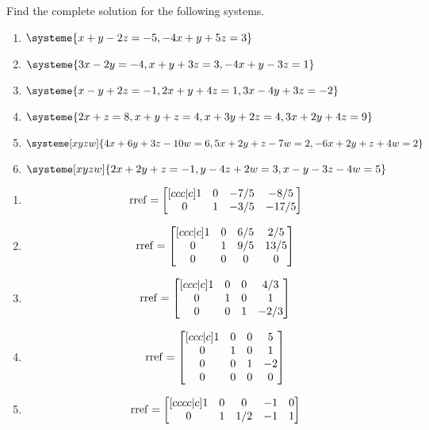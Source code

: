 \begin{exercises}
	\begin{problist}
		\prob Find the complete solution for the following systems.
		\begin{enumerate}
			\item $\systeme{x+y-2z=-5,-4x+y+5z=3}$
			\item $\systeme{3x-2y=-4,x+y+3z=3,-4x+y-3z=1}$
			\item $\systeme{x-y+2z=-1,2x+y+4z=1,3x-4y+3z=-2}$
			\item $\systeme{2x+z=8,x+y+z=4,x+3y+2z=4,3x+2y+4z=9}$
			\item $\systeme[xyzw]{4x+6y+3z-10w=6,5x+2y+z-7w=2,-6x+2y+z+4w=2}$
			\item $\systeme[xyzw]{2x+2y+z=-1,y-4z+2w=3,x-y-3z-4w=5}$
		\end{enumerate}
		\begin{solution}
			\begin{enumerate}
				\item 
				\[
					\operatorname{rref}=
					\begin{bmatrix}[ccc|c]
					1 & 0 & -7/5 & -8/5\\
					0 & 1 & -3/5 & -17/5
					\end{bmatrix}
				\]
				\item 
				\[
					\operatorname{rref}=
					\begin{bmatrix}[ccc|c]
					1 & 0 & 6/5 & 2/5\\
					0 & 1 & 9/5 & 13/5\\
					0 & 0 & 0 & 0
					\end{bmatrix}
				\]
				\item 
				\[
					\operatorname{rref}=
					\begin{bmatrix}[ccc|c]
					1 & 0 & 0 & 4/3\\
					0 & 1 & 0 & 1\\
					0 & 0 & 1 & -2/3
					\end{bmatrix}
				\]
				\item 
				\[
				\operatorname{rref}=
				\begin{bmatrix}[ccc|c]
					1 & 0 & 0 & 5\\
					0 & 1 & 0 & 1\\
					0 & 0 & 1 & -2\\
					0 & 0 & 0 & 0
				\end{bmatrix}
				\]
				\item 
				\[
					\operatorname{rref}=
					\begin{bmatrix}[cccc|c]
					1 & 0 & 0 & -1 & 0\\
					0 & 1 & 1/2 & -1 & 1\\

\end{bmatrix}\]
\end{enumerate}
\end{solution}
\end{problist}
\end{exercises}
